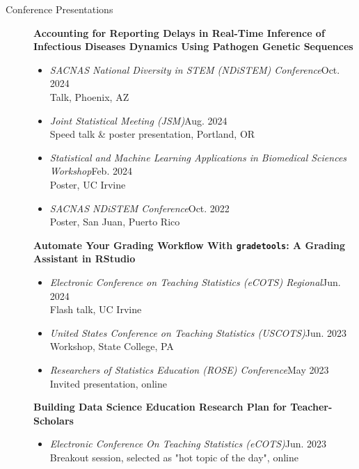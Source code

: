 \documentclass{article}
\begin{document}
	\begin{description}
		\vspace{-2mm}
		\item[Conference Presentations]\hspace*{.1in}
		
		\textbf{Accounting for Reporting Delays in Real-Time Inference of Infectious Diseases Dynamics Using Pathogen Genetic Sequences}
		\begin{itemize}
			\item \textit{SACNAS National Diversity in STEM (NDiSTEM) Conference}\hfill{Oct. 2024}\\
			Talk, Phoenix, AZ
			
			\item \textit{Joint Statistical Meeting (JSM)}\hfill{Aug. 2024}\\
			Speed talk \& poster presentation, Portland, OR
			
			\item \textit{Statistical and Machine Learning Applications in Biomedical Sciences Workshop}\hfill{Feb. 2024}\\
			Poster, UC Irvine
			
			\item \textit{SACNAS NDiSTEM Conference}\hfill{Oct. 2022}\\ 
			Poster, San Juan, Puerto Rico 
		\end{itemize}
		
		\textbf{Automate Your Grading Workflow With \texttt{gradetools}: A Grading Assistant in RStudio}
		\begin{itemize}
			\item \textit{Electronic Conference on Teaching Statistics (eCOTS) Regional}\hfill{Jun. 2024}\\
			Flash talk, UC Irvine
			
			\item \textit{United States Conference on Teaching Statistics (USCOTS)}\hfill{Jun. 2023}\\
			Workshop, State College, PA
			
			\item \textit{Researchers of Statistics Education (ROSE) Conference}\hfill{May 2023}\\
			Invited presentation, online
		\end{itemize}
		
		\textbf{Building Data Science Education Research Plan for Teacher-Scholars}
		\begin{itemize}
			\item \textit{Electronic Conference On Teaching Statistics (eCOTS)}\hfill{Jun. 2023}\\
			Breakout session, selected as "hot topic of the day", online
		\end{itemize}
		

\end{description}
\end{document}
